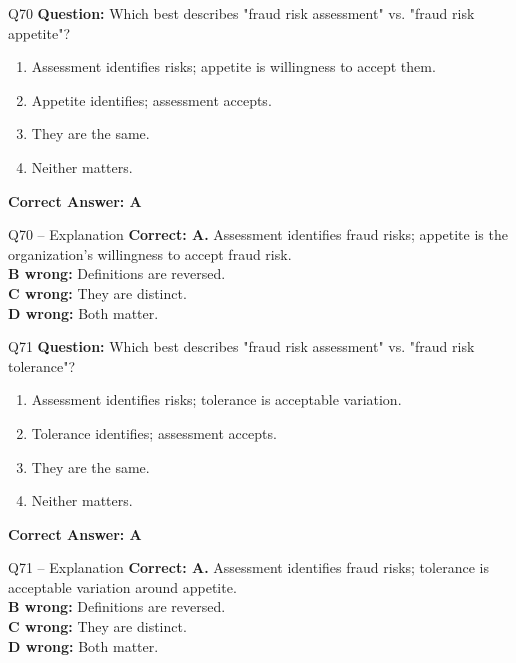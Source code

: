 \documentclass[aspectratio=169,10pt]{beamer}
\begin{document}
	\begin{frame}[t]{Q70}
		\small
		\textbf{Question:} Which best describes "fraud risk assessment" vs. "fraud risk appetite"?
		\begin{enumerate}[label=\Alph*.,itemsep=1pt,topsep=2pt]
			\item Assessment identifies risks; appetite is willingness to accept them.
			\item Appetite identifies; assessment accepts.
			\item They are the same.
			\item Neither matters.
		\end{enumerate}
		\vspace{4pt}
		\textbf{Correct Answer: A}
	\end{frame}
	
	\begin{frame}[t]{Q70 -- Explanation}
		\small
		\textbf{Correct: A.} Assessment identifies fraud risks; appetite is the organization's willingness to accept fraud risk. \\[4pt]
		\textbf{B wrong:} Definitions are reversed. \\[2pt]
		\textbf{C wrong:} They are distinct. \\[2pt]
		\textbf{D wrong:} Both matter.
	\end{frame}
	
	\begin{frame}[t]{Q71}
		\small
		\textbf{Question:} Which best describes "fraud risk assessment" vs. "fraud risk tolerance"?
		\begin{enumerate}[label=\Alph*.,itemsep=1pt,topsep=2pt]
			\item Assessment identifies risks; tolerance is acceptable variation.
			\item Tolerance identifies; assessment accepts.
			\item They are the same.
			\item Neither matters.
		\end{enumerate}
		\vspace{4pt}
		\textbf{Correct Answer: A}
	\end{frame}
	
	\begin{frame}[t]{Q71 -- Explanation}
		\small
		\textbf{Correct: A.} Assessment identifies fraud risks; tolerance is acceptable variation around appetite. \\[4pt]
		\textbf{B wrong:} Definitions are reversed. \\[2pt]
		\textbf{C wrong:} They are distinct. \\[2pt]
		\textbf{D wrong:} Both matter.
	\end{frame}
	
\end{document}
